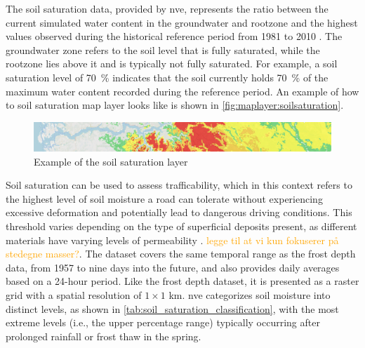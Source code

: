 The soil saturation data, provided by \acrshort{nve}, represents the ratio between the current simulated water content in the \gls{groundwater} and \gls{rootzone} and the highest values observed during the historical reference period from 1981 to 2010 \cite{nve2025waterdata}. The \gls{groundwater} zone refers to the soil level that is fully saturated, while the \gls{rootzone} lies above it and is typically not fully saturated. For example, a soil saturation level of \qty{70}{\percent} indicates that the soil currently holds \qty{70}{\percent} of the maximum water content recorded during the reference period. An example of how to soil saturation map layer looks like is shown in \autoref{fig:maplayer:soilsaturation}.

\begin{figure}[h]
    \centering
    \includegraphics[width=1\linewidth]{images/maplayers/soilmoisture.png}
    \caption{Example of the soil saturation layer}
    \label{fig:maplayer:soilsaturation}
\end{figure}

Soil saturation can be used to assess \gls{trafficability}, which in this context refers to the highest level of soil moisture a road can tolerate without experiencing excessive deformation and potentially lead to dangerous driving conditions. This threshold varies depending on the type of superficial deposits present, as different materials have varying levels of permeability \cite{fjeld2023trafficability}. \textcolor{orange}{legge til at vi kun fokuserer på stedegne masser?}. The dataset covers the same temporal range as the frost depth data, from 1957 to nine days into the future, and also provides daily averages based on a 24-hour period. Like the frost depth dataset, it is presented as a raster grid with a spatial resolution of $1 \times 1$ km. \acrshort{nve} categorizes soil moisture into distinct levels, as shown in \autoref{tab:soil_saturation_classification}, with the most extreme levels (i.e., the upper percentage range) typically occurring after prolonged rainfall or frost thaw in the spring.

